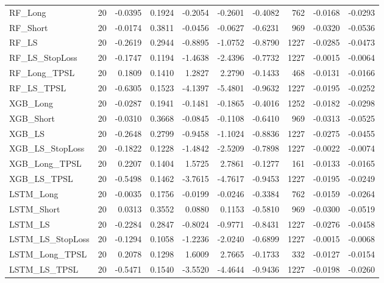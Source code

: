\begin{tabular}{llrrrrrrrr}
\cline{1-10}
RF\_Long & 20 & -0.0395 & 0.1924 & -0.2054 & -0.2601 & -0.4082 & 762 & -0.0168 & -0.0293 \\
\cline{1-10}
RF\_Short & 20 & -0.0174 & 0.3811 & -0.0456 & -0.0627 & -0.6231 & 969 & -0.0320 & -0.0536 \\
\cline{1-10}
RF\_LS & 20 & -0.2619 & 0.2944 & -0.8895 & -1.0752 & -0.8790 & 1227 & -0.0285 & -0.0473 \\
\cline{1-10}
RF\_LS\_StopLoss & 20 & -0.1747 & 0.1194 & -1.4638 & -2.4396 & -0.7732 & 1227 & -0.0015 & -0.0064 \\
\cline{1-10}
RF\_Long\_TPSL & 20 & 0.1809 & 0.1410 & 1.2827 & 2.2790 & -0.1433 & 468 & -0.0131 & -0.0166 \\
\cline{1-10}
RF\_LS\_TPSL & 20 & -0.6305 & 0.1523 & -4.1397 & -5.4801 & -0.9632 & 1227 & -0.0195 & -0.0252 \\
\cline{1-10}
XGB\_Long & 20 & -0.0287 & 0.1941 & -0.1481 & -0.1865 & -0.4016 & 1252 & -0.0182 & -0.0298 \\
\cline{1-10}
XGB\_Short & 20 & -0.0310 & 0.3668 & -0.0845 & -0.1108 & -0.6410 & 969 & -0.0313 & -0.0525 \\
\cline{1-10}
XGB\_LS & 20 & -0.2648 & 0.2799 & -0.9458 & -1.1024 & -0.8836 & 1227 & -0.0275 & -0.0455 \\
\cline{1-10}
XGB\_LS\_StopLoss & 20 & -0.1822 & 0.1228 & -1.4842 & -2.5209 & -0.7898 & 1227 & -0.0022 & -0.0074 \\
\cline{1-10}
XGB\_Long\_TPSL & 20 & 0.2207 & 0.1404 & 1.5725 & 2.7861 & -0.1277 & 161 & -0.0133 & -0.0165 \\
\cline{1-10}
XGB\_LS\_TPSL & 20 & -0.5498 & 0.1462 & -3.7615 & -4.7617 & -0.9453 & 1227 & -0.0195 & -0.0249 \\
\cline{1-10}
LSTM\_Long & 20 & -0.0035 & 0.1756 & -0.0199 & -0.0246 & -0.3384 & 762 & -0.0159 & -0.0264 \\
\cline{1-10}
LSTM\_Short & 20 & 0.0313 & 0.3552 & 0.0880 & 0.1153 & -0.5810 & 969 & -0.0300 & -0.0519 \\
\cline{1-10}
LSTM\_LS & 20 & -0.2284 & 0.2847 & -0.8024 & -0.9771 & -0.8431 & 1227 & -0.0276 & -0.0458 \\
\cline{1-10}
LSTM\_LS\_StopLoss & 20 & -0.1294 & 0.1058 & -1.2236 & -2.0240 & -0.6899 & 1227 & -0.0015 & -0.0068 \\
\cline{1-10}
LSTM\_Long\_TPSL & 20 & 0.2078 & 0.1298 & 1.6009 & 2.7665 & -0.1733 & 332 & -0.0127 & -0.0154 \\
\cline{1-10}
LSTM\_LS\_TPSL & 20 & -0.5471 & 0.1540 & -3.5520 & -4.4644 & -0.9436 & 1227 & -0.0198 & -0.0260 \\
\cline{1-10}
\bottomrule
\end{tabular}
